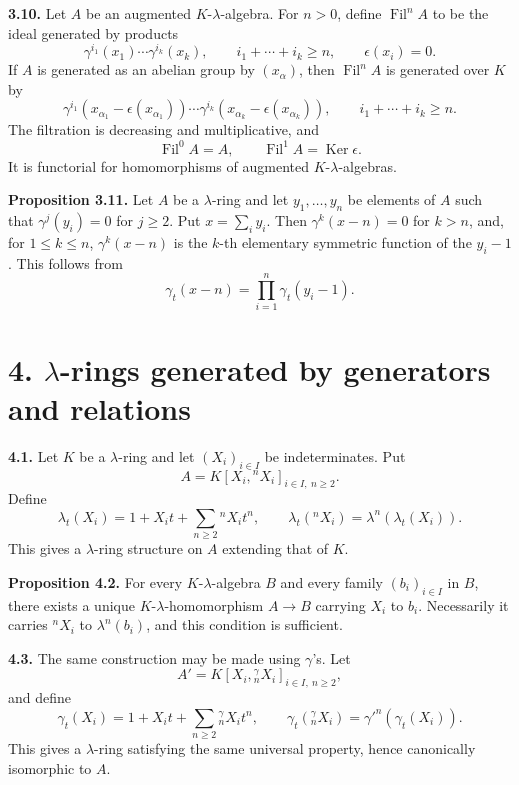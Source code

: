 \documentclass[11pt]{article}
\newcommand{\Fil}{\operatorname{Fil}}
\providecommand{\Ker}{\operatorname{Ker}}
\begin{document}
\textbf{3.10.} Let \(A\) be an augmented \(K\)-\(\lambda\)-algebra. For \(n>0\), define \(\Fil^n A\) to be the ideal generated by products
\begin{equation}\tag{3.10.1}
  \gamma^{i_1}(x_1)\cdots\gamma^{i_k}(x_k),
  \qquad i_1+\cdots+i_k\ge n,
  \qquad \epsilon(x_i)=0.
\end{equation}
If \(A\) is generated as an abelian group by \((x_\alpha)\), then \(\Fil^nA\) is generated over \(K\) by
\begin{equation}\tag{3.10.2}
  \gamma^{i_1}(x_{\alpha_1}-\epsilon(x_{\alpha_1}))\cdots
  \gamma^{i_k}(x_{\alpha_k}-\epsilon(x_{\alpha_k})),
  \qquad i_1+\cdots+i_k\ge n.
\end{equation}
The filtration is decreasing and multiplicative, and
\[
  \Fil^0A=A,
  \qquad \Fil^1A=\Ker\epsilon.
\]
It is functorial for homomorphisms of augmented \(K\)-\(\lambda\)-algebras.

\textbf{Proposition 3.11.} Let \(A\) be a \(\lambda\)-ring and let \(y_1,\ldots,y_n\) be elements of \(A\) such that \(\gamma^j(y_i)=0\) for \(j\ge2\). Put \(x=\sum_i y_i\). Then \(\gamma^k(x-n)=0\) for \(k>n\), and, for \(1\le k\le n\), \(\gamma^k(x-n)\) is the \(k\)-th elementary symmetric function of the \(y_i-1\). This follows from
\[
  \gamma_t(x-n)=\prod_{i=1}^{n}\gamma_t(y_i-1).
\]

\section*{4. \(\lambda\)-rings generated by generators and relations}

\textbf{4.1.} Let \(K\) be a \(\lambda\)-ring and let \((X_i)_{i\in I}\) be indeterminates. Put
\[
  A=K[X_i,{}^nX_i]_{i\in I,\ n\ge2}.
\]
Define
\begin{equation}\tag{4.1.1}
  \lambda_t(X_i)=1+X_it+\sum_{n\ge2}{}^nX_i t^n,
  \qquad
  \lambda_t({}^nX_i)=\lambda^n(\lambda_t(X_i)).
\end{equation}
This gives a \(\lambda\)-ring structure on \(A\) extending that of \(K\).

\textbf{Proposition 4.2.} For every \(K\)-\(\lambda\)-algebra \(B\) and every family \((b_i)_{i\in I}\) in \(B\), there exists a unique \(K\)-\(\lambda\)-homomorphism \(A\to B\) carrying \(X_i\) to \(b_i\). Necessarily it carries \({}^nX_i\) to \(\lambda^n(b_i)\), and this condition is sufficient.

\textbf{4.3.} The same construction may be made using \(\gamma\)'s. Let
\[
  A'=K[X_i,{}^\gamma_nX_i]_{i\in I,\ n\ge2},
\]
and define
\begin{equation}\tag{4.3.1}
  \gamma_t(X_i)=1+X_it+\sum_{n\ge2}{}^\gamma_nX_i t^n,
  \qquad
  \gamma_t({}^\gamma_nX_i)=\gamma'^n(\gamma_t(X_i)).
\end{equation}
This gives a \(\lambda\)-ring satisfying the same universal property, hence canonically isomorphic to \(A\).
\end{document}
